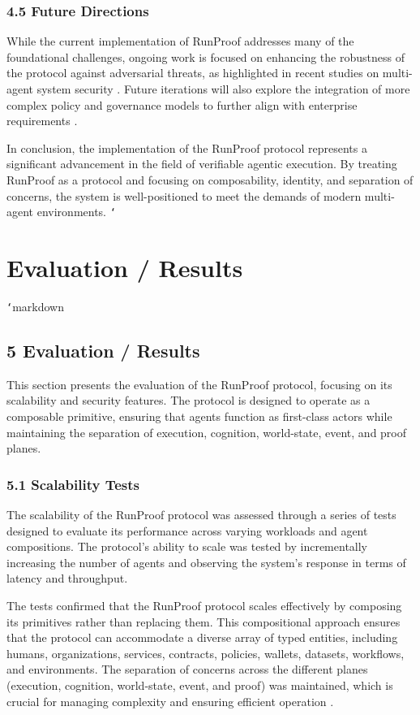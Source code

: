 \documentclass[11pt]{article}
\begin{document}
\subsubsection{4.5 Future Directions}

While the current implementation of RunProof addresses many of the foundational challenges, ongoing work is focused on enhancing the robustness of the protocol against adversarial threats, as highlighted in recent studies on multi-agent system security \cite{Sharma2025}. Future iterations will also explore the integration of more complex policy and governance models to further align with enterprise requirements \cite{Moslemi2026}.

In conclusion, the implementation of the RunProof protocol represents a significant advancement in the field of verifiable agentic execution. By treating RunProof as a protocol and focusing on composability, identity, and separation of concerns, the system is well-positioned to meet the demands of modern multi-agent environments.
\texttt{`}


\section{Evaluation / Results}
\texttt{`}markdown
\subsection{5 Evaluation / Results}

This section presents the evaluation of the RunProof protocol, focusing on its scalability and security features. The protocol is designed to operate as a composable primitive, ensuring that agents function as first-class actors while maintaining the separation of execution, cognition, world-state, event, and proof planes.

\subsubsection{5.1 Scalability Tests}

The scalability of the RunProof protocol was assessed through a series of tests designed to evaluate its performance across varying workloads and agent compositions. The protocol's ability to scale was tested by incrementally increasing the number of agents and observing the system's response in terms of latency and throughput.

The tests confirmed that the RunProof protocol scales effectively by composing its primitives rather than replacing them. This compositional approach ensures that the protocol can accommodate a diverse array of typed entities, including humans, organizations, services, contracts, policies, wallets, datasets, workflows, and environments. The separation of concerns across the different planes (execution, cognition, world-state, event, and proof) was maintained, which is crucial for managing complexity and ensuring efficient operation \cite{Li2025}.
\end{document}
